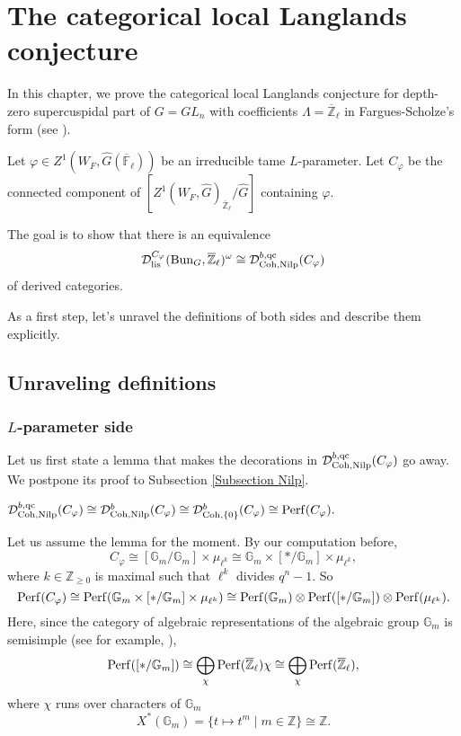 \chapter{The categorical local Langlands conjecture} \label{Chapter CLLC}

In this chapter, we prove the categorical local Langlands conjecture for depth-zero supercuspidal part of $G=GL_n$ with coefficients $\Lambda=\overline{\mathbb{Z}}_{\ell}$ in Fargues-Scholze's form (see \cite[Conjecture X.3.5]{fargues2021geometrization}).

Let $\varphi \in Z^1(W_F, \hat{G}(\overline{\mathbb{F}}_{\ell}))$ be an irreducible tame $L$-parameter. Let $C_{\varphi}$ be the connected component of $[Z^1(W_F, \hat{G})_{\overline{\mathbb{Z}}_{\ell}}/\hat{G}]$ containing $\varphi$. 

The goal is to show that there is an equivalence
$$\mathcal{D}_{\operatorname{\operatorname{lis}}}^{C_{\varphi}}(\operatorname{\operatorname{Bun}}_G, \overline{\mathbb{Z}}_{\ell})^{\omega} \cong \mathcal{D}^{b, \operatorname{\operatorname{qc}}}_{\operatorname{\operatorname{Coh}}, \operatorname{\operatorname{Nilp}}}(C_{\varphi})$$
of derived categories.

As a first step, let's unravel the definitions of both sides and describe them explicitly.

\section{Unraveling definitions}

\subsection{$L$-parameter side}

Let us first state a lemma that makes the decorations in $\mathcal{D}^{b, \operatorname{\operatorname{qc}}}_{\operatorname{\operatorname{Coh}}, \operatorname{\operatorname{Nilp}}}(C_{\varphi})$ go away. We postpone its proof to Subsection \ref{Subsection Nilp}.

\begin{lemma} \label{Lemma 1}
	$\mathcal{D}^{b, \operatorname{\operatorname{qc}}}_{\operatorname{\operatorname{Coh}}, \operatorname{\operatorname{Nilp}}}(C_{\varphi}) \cong \mathcal{D}^{b}_{\operatorname{\operatorname{Coh}}, \operatorname{\operatorname{Nilp}}}(C_{\varphi}) \cong \mathcal{D}^b_{\operatorname{\operatorname{Coh}}, \{0\}}(C_{\varphi}) \cong \operatorname{\operatorname{Perf}}(C_{\varphi}).$
\end{lemma} 
	
Let us assume the lemma for the moment. By our computation before,
$$C_{\varphi} \cong [\mathbb{G}_m/\mathbb{G}_m] \times \mu_{\ell^k} \cong \mathbb{G}_m \times [*/\mathbb{G}_m] \times \mu_{\ell^k},$$
where $k \in \mathbb{Z}_{\geq 0}$ is maximal such that $\ell^k$ divides $q^n-1$. So
$$\operatorname{\operatorname{Perf}}(C_{\varphi}) \cong \operatorname{\operatorname{Perf}}(\mathbb{G}_m \times [*/\mathbb{G}_m] \times \mu_{\ell^k}) \cong \operatorname{\operatorname{Perf}}(\mathbb{G}_m) \otimes \operatorname{\operatorname{Perf}}([*/\mathbb{G}_m]) \otimes \operatorname{\operatorname{Perf}}(\mu_{\ell^k}).$$
Here, since the category of algebraic representations of the algebraic group $\mathbb{G}_m$ is semisimple (see for example, \cite[I.2.11]{jantzen2003representation}),
$$\operatorname{\operatorname{Perf}}([*/\mathbb{G}_m]) \cong \bigoplus_{\chi}\operatorname{\operatorname{Perf}}(\overline{\mathbb{Z}}_{\ell})\chi \cong \bigoplus_{\chi}\operatorname{\operatorname{Perf}}(\overline{\mathbb{Z}}_{\ell}),$$
where $\chi$ runs over characters of $\mathbb{G}_m$ 
$$X^*(\mathbb{G}_m)=\{t \mapsto t^m \;|\; m \in \mathbb{Z}\} \cong \mathbb{Z}.$$

